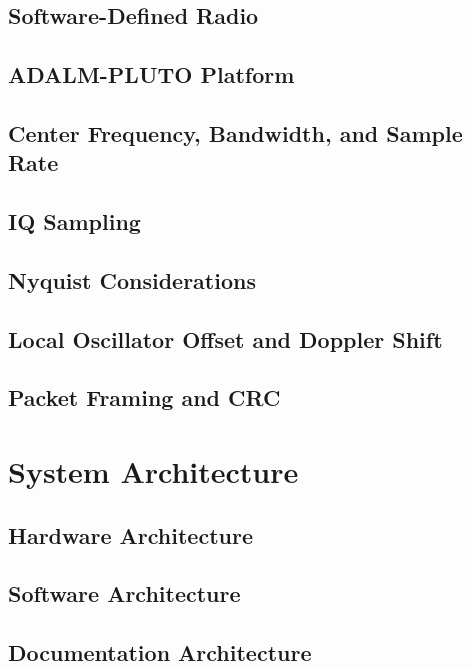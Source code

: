 \documentclass[conference]{IEEEtran}
\begin{document}
\subsection{Software-Defined Radio}

\subsection{ADALM-PLUTO Platform}

\subsection{Center Frequency, Bandwidth, and Sample Rate}

\subsection{IQ Sampling}

\subsection{Nyquist Considerations}

\subsection{Local Oscillator Offset and Doppler Shift}

\subsection{Packet Framing and CRC}

\section{System Architecture}

\subsection{Hardware Architecture}

\subsection{Software Architecture}

\subsection{Documentation Architecture}
\end{document}
